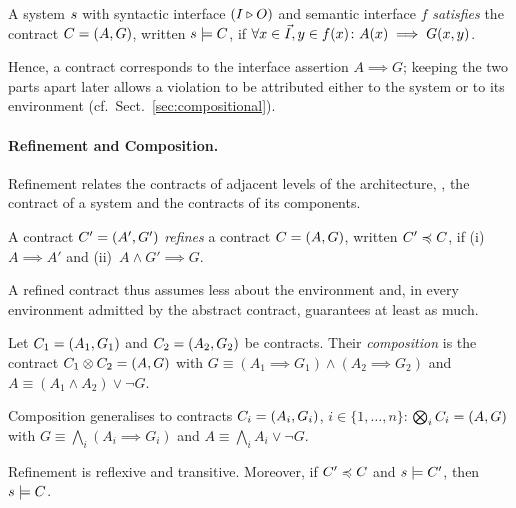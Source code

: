\begin{definition}[Satisfaction]\label{def:satisfaction}
  A system ${s}$ with syntactic interface $(I \triangleright O)$ and semantic interface $f$ \emph{satisfies} the contract $C = (A,G)$, written ${s} \models C$, if $\forall x \in \vec{I}, y \in f(x)\colon A(x) \implies G(x, y)$.
\end{definition}

\noindent Hence, a contract corresponds to the interface assertion $A \implies G$; keeping the two parts apart later allows a violation to be attributed either to the system or to its environment (cf.\ Sect.~\ref{sec:compositional}).

\paragraph{Refinement and Composition.} Refinement relates the contracts of adjacent levels of the architecture, \eg, the contract of a system and the contracts of its components.

\begin{definition}[Refinement]\label{def:refinement}
  A contract $C' = (A',G')$ \emph{refines} a contract $C = (A,G)$, written $C' \preccurlyeq C$, if (i)~$A \implies A'$ and (ii)~$A \land G' \implies G$.
\end{definition}

\noindent A refined contract thus assumes less about the environment and, in every environment admitted by the abstract contract, guarantees at least as much.

\begin{definition}[Composition]\label{def:composition}
  Let $C_1 = (A_1,G_1)$ and $C_2 = (A_2,G_2)$ be contracts. Their \emph{composition} is the contract $C_1 \otimes C_2 = (A,G)$ with $G \equiv (A_1 \implies G_1) \land (A_2 \implies G_2)$ and $A \equiv (A_1 \land A_2) \lor \lnot G$.
\end{definition}

\noindent
Composition generalises to contracts $C_i = (A_i,G_i)$, $i \in \{1, \dots, n\}$: $\bigotimes_i C_i = (A,G)$ with $G \equiv \bigwedge_i (A_i \implies G_i)$ and $A \equiv \bigwedge_i A_i \lor \lnot G$.

\begin{theorem}\label{thm:refinement}
  Refinement is reflexive and transitive. Moreover, if $C' \preccurlyeq C$ and ${s} \models C'$, then ${s} \models C$.
\end{theorem}

